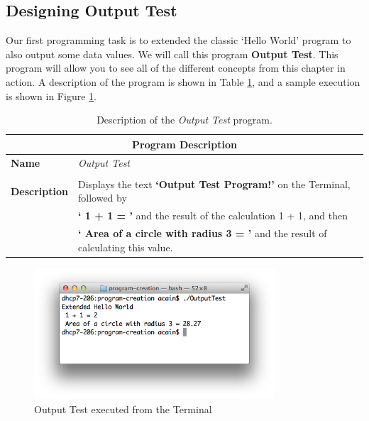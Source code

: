 \subsection{Designing Output Test} %
\label{sub:designing_hello_world}

Our first programming task is to extended the classic `Hello World' program to also output some data values. We will call this program \textbf{Output Test}. This program will allow you to see all of the different concepts from this chapter in action. A description of the program is shown in Table \ref{tbl:program-creation-hello world description}, and a sample execution is shown in Figure \ref{fig:program-creation-helloworld2}.

\begin{table}[h]
\centering
\begin{tabular}{l|p{12cm}}
  \hline
  \multicolumn{2}{c}{\textbf{Program Description}} \\
  \hline
  \textbf{Name} & \emph{Output Test} \\
  \\
  \textbf{Description} & Displays the text \textbf{`Output Test Program!'} on the Terminal, followed by \\
                       & \textbf{` 1 + 1 = '} and the result of the calculation 1 + 1, and then \\
                       & \textbf{` Area of a circle with radius 3 = '} and the result of calculating this value. \\
  \hline
\end{tabular}
\caption[Output Test Description]{Description of the \emph{Output Test} program.}
\label{tbl:program-creation-hello world description}
\end{table}

\begin{figure}[h]
   \centering
   \includegraphics[width=0.8\textwidth]{./topics/program-creation/images/HelloWorld} 
   \caption{Output Test executed from the Terminal}
   \label{fig:program-creation-helloworld2}
\end{figure}

